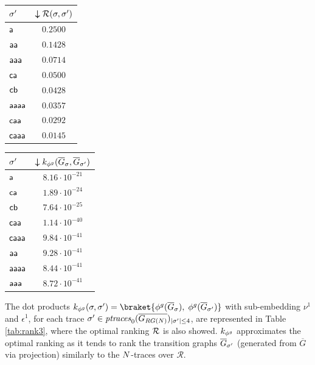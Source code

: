 \begin{table}[!t]
{\begin{tabular}{l|c}
	{$\nonlogtrace$} &
	{$\boldsymbol{\downarrow}\goldenrank(\logtrace,\nonlogtrace)$} \\
	
	
	\midrule
	$\const{a}$  &  $0.2500$ \\
	$\const{aa}$  &  $0.1428$  \\
	$\const{aaa}$  & $0.0714$ \\
	$\const{ca}$  &   $0.0500$\\
	$\const{cb}$  & $0.0428$ \\
	$\const{aaaa}$  &  $0.0357$ \\
	$\const{caa}$  &  $0.0292$ \\
	$\const{caaa}$  &   $0.0145$ \\
	\bottomrule
\end{tabular}\quad	\begin{tabular}{l|c}
	\toprule
	
	{$\nonlogtrace$} &
	{$\boldsymbol{\downarrow}k_{\gorgembed}(\closed{G}_\logtrace,\closed{G}_{\nonlogtrace})$} \\

	
	\midrule
	$\const{a}$  & $8.16\cdot 10^{-21}$ \\
	$\const{ca}$  &   $1.89\cdot 10^{-24}$\\
	$\const{cb}$  &   $7.64\cdot 10^{-25}$\\
	$\const{caa}$  &$1.14\cdot 10^{-40}$\\
	$\const{caaa}$  &  $9.84\cdot 10^{-41}$\\
	$\const{aa}$  &  $9.28\cdot 10^{-41}$ \\
	$\const{aaaa}$  & $8.44\cdot 10^{-41}$\\
	$\const{aaa}$  &  $8.72\cdot 10^{-41}$\\
	\bottomrule
\end{tabular}}
\end{table}




\begin{example}%
	The dot products $k_{\gorgembed}(\logtrace,\nonlogtrace)=\braket{\gorgembed(\overline{G}_\logtrace),\;\gorgembed(\overline{G}_{\nonlogtrace})}$ with sub-embedding $\nu^1$ and $\epsilon^1$, for each trace $\nonlogtrace\in\WCal{0}{4}_{|\sigma'|\leq 4}$, are represented in Table \ref{tab:rank3}, where the optimal ranking $\goldenrank$ is also showed. $k_{\gorgembed}$ approximates the optimal ranking as it tends to rank the transition graphs $\closed{G}_\nonlogtrace$ (generated from $\overline{G}$ via projection) similarly to the $\net$-traces over $\mathcal{R}$.
\end{example}


